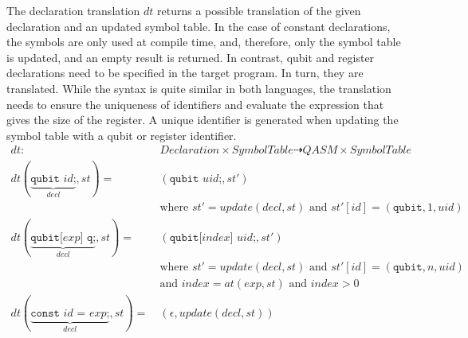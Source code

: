 The declaration translation $dt$ returns a possible translation of the given declaration and an updated symbol table. In the case of constant declarations, the symbols are only used at compile time, and, therefore, only the symbol table is updated, and an empty result is returned. In contrast, qubit and register declarations need to be specified in the target program. In turn, they are translated. While the syntax is quite similar in both languages, the translation needs to ensure the uniqueness of identifiers and evaluate the expression that gives the size of the register. A unique identifier is generated when updating the symbol table with a qubit or register identifier.
\begin{align*}
    dt : \ & Declaration \times SymbolTable \dashrightarrow QASM \times SymbolTable\\
    dt(\underbrace{\texttt{qubit } id \text{;}}_{decl}, st) = \ & (\texttt{qubit } uid\texttt{;}, st')\\
                                                                & \text{where } st' = update(decl, st) \text{ and } st'[id] = (\texttt{qubit}, 1, uid)\\
    dt(\underbrace{\texttt{qubit[} exp \texttt{] q;}}_{decl}, st) = \ & (\texttt{qubit[} index \texttt{] } uid\texttt{;}, st')\\
                                                                & \text{where } st' = update(decl, st) \text{ and } st'[id] = (\texttt{qubit}, n, uid)\\
                                                                & \text{and } index = at(exp, st) \text{ and } index > 0 \\
    dt(\underbrace{\texttt{const } id \texttt{ = } exp \texttt{;}}_{decl}, st) = \ & (\epsilon, update(decl, st))
\end{align*}

